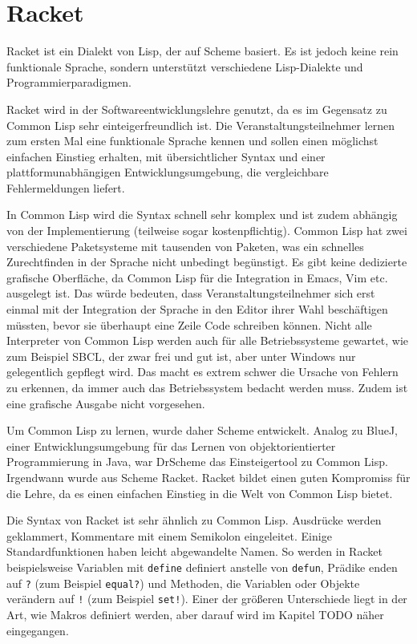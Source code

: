 \chapter{Racket}
Racket ist ein Dialekt von Lisp, der auf Scheme basiert\cite{racketguide-dialects}. Es ist jedoch keine rein funktionale Sprache, sondern unterstützt verschiedene Lisp-Dialekte und  Programmierparadigmen. 

Racket wird in der Softwareentwicklungslehre genutzt, da es im Gegensatz zu Common Lisp sehr einteigerfreundlich ist. Die Veranstaltungsteilnehmer lernen zum ersten Mal eine funktionale Sprache kennen und sollen einen möglichst einfachen Einstieg erhalten, mit übersichtlicher Syntax und einer plattformunabhängigen Entwicklungsumgebung, die vergleichbare Fehlermeldungen liefert.

In Common Lisp wird die Syntax schnell sehr komplex und ist zudem abhängig von der Implementierung (teilweise sogar kostenpflichtig). Common Lisp hat zwei verschiedene Paketsysteme mit tausenden von Paketen, was ein schnelles Zurechtfinden in der Sprache nicht unbedingt begünstigt. Es gibt keine dedizierte grafische Oberfläche, da Common Lisp für die Integration in Emacs, Vim etc. ausgelegt ist. Das würde bedeuten, dass Veranstaltungsteilnehmer sich erst einmal mit der Integration der Sprache in den Editor ihrer Wahl beschäftigen müssten, bevor sie überhaupt eine Zeile Code schreiben können. Nicht alle Interpreter von Common Lisp werden auch für alle Betriebssysteme gewartet, wie zum Beispiel SBCL, der zwar frei und gut ist, aber unter Windows nur gelegentlich gepflegt wird. Das macht es extrem schwer die Ursache von Fehlern zu erkennen, da immer auch das Betriebssystem bedacht werden muss. Zudem ist eine grafische Ausgabe nicht vorgesehen. %

Um Common Lisp zu lernen, wurde daher Scheme entwickelt. Analog zu BlueJ, einer Entwicklungsumgebung für das Lernen von objektorientierter Programmierung in Java, war DrScheme das Einsteigertool zu Common Lisp. Irgendwann wurde aus Scheme Racket. Racket bildet einen guten Kompromiss für die Lehre, da es einen einfachen Einstieg in die Welt von Common Lisp bietet.

Die Syntax von Racket ist sehr ähnlich zu Common Lisp. Ausdrücke werden geklammert, Kommentare mit einem Semikolon eingeleitet. Einige Standardfunktionen haben leicht abgewandelte Namen. So werden in Racket beispielsweise Variablen mit \texttt{define} definiert anstelle von \texttt{defun}, Prädike enden auf \texttt{?} (zum Beispiel \texttt{equal?}) und Methoden, die Variablen oder Objekte verändern auf \texttt{!} (zum Beispiel \texttt{set!}). Einer der größeren Unterschiede liegt in der Art, wie Makros definiert werden, aber darauf wird im Kapitel TODO %
näher eingegangen.

